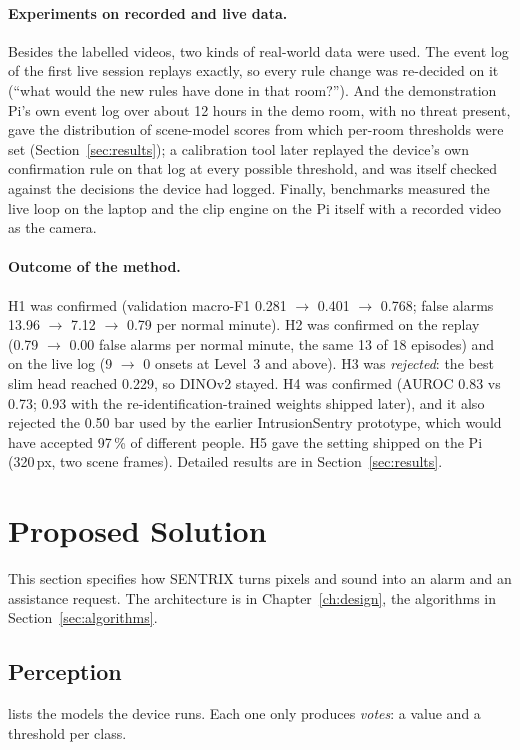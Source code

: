 \paragraph{Experiments on recorded and live data.} Besides the labelled videos, two kinds of real-world data were used. The event log of the first live session replays exactly, so every rule change was re-decided on it (``what would the new rules have done in that room?''). And the demonstration Pi's own event log over about 12 hours in the demo room, with no threat present, gave the distribution of scene-model scores from which per-room thresholds were set (Section~\ref{sec:results}); a calibration tool later replayed the device's own confirmation rule on that log at every possible threshold, and was itself checked against the decisions the device had logged. Finally, benchmarks measured the live loop on the laptop and the clip engine on the Pi itself with a recorded video as the camera.

\paragraph{Outcome of the method.} H1 was confirmed (validation macro-F1 0.281 $\to$ 0.401 $\to$ 0.768; false alarms 13.96 $\to$ 7.12 $\to$ 0.79 per normal minute). H2 was confirmed on the replay (0.79 $\to$ 0.00 false alarms per normal minute, the same 13 of 18 episodes) and on the live log (9 $\to$ 0 onsets at Level~3 and above). H3 was \emph{rejected}: the best slim head reached 0.229, so DINOv2 stayed. H4 was confirmed (AUROC 0.83 vs 0.73; 0.93 with the re-identification-trained weights shipped later), and it also rejected the 0.50 bar used by the earlier IntrusionSentry prototype, which would have accepted 97\,\% of different people. H5 gave the setting shipped on the Pi (320\,px, two scene frames). Detailed results are in Section~\ref{sec:results}.

\section{Proposed Solution}
\label{sec:proposed}

This section specifies how SENTRIX turns pixels and sound into an alarm and an assistance request. The architecture is in Chapter~\ref{ch:design}, the algorithms in Section~\ref{sec:algorithms}.

\subsection{Perception}
 lists the models the device runs. Each one only produces \emph{votes}: a value and a threshold per class.

